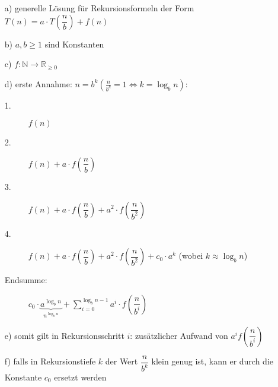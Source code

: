 	\begin{itemize}
		\item[a)] generelle Lösung für Rekursionsformeln der Form\\
		$T(n) = a \cdot T(\dfrac{n}{b})+f(n)$
		\item[b)] $a,b \geq 1$ sind Konstanten
		\item[c)] $f: \mathbb{N}\rightarrow \mathbb{R}_{\geq 0}$
		\item[d)] erste Annahme: $n=b^k \left(\frac{n}{b^k} = 1 \Leftrightarrow k = \log_b n\right)$:\\
			\scalebox{0.75}{}
			\begin{description}
				\item[1.] $f(n)$
				\item[2.] $f(n) + a\cdot f\left( \dfrac{n}{b}\right)$
				\item[3.] $f(n) + a\cdot f\left( \dfrac{n}{b}\right) + a^2\cdot f\left( \dfrac{n}{b^2}\right)$
				\item[4.] $f(n) + a\cdot f\left( \dfrac{n}{b}\right) + a^2\cdot f\left( \dfrac{n}{b^2}\right) + c_0\cdot a^k$ (wobei $k \approx \log_b n$)
				\item[Endsumme:] $c_0\cdot \underbrace{a^{\log_b n}}_{n^{\log_b a}} + \sum\limits_{i=0}^{\log_b n -1} a^i \cdot f\left(\dfrac{n}{b^i}\right)$
			\end{description}
		\item[e)] somit gilt in Rekursionsschritt $i$: zusätzlicher Aufwand von $a^i f\left(\dfrac{n}{b^i}\right)$
		\item[f)] falls in Rekursionstiefe $k$ der Wert $\dfrac{n}{b^k}$ klein genug ist, kann er durch die Konstante $c_0$ ersetzt werden
	\end{itemize}
